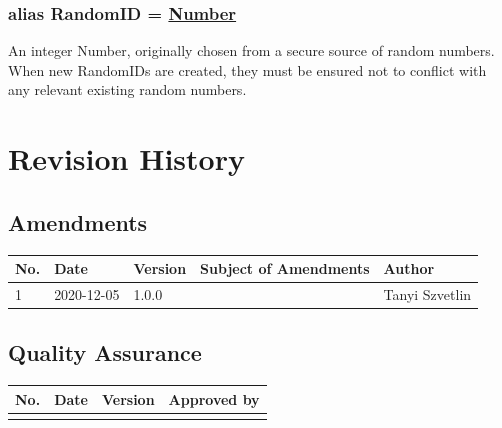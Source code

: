 \documentclass[a4paper]{arrowhead}
\newcommand{\pdef}[1]{{\textcolor{ArrowheadGrey}{#1\label{sec:model:primitives:#1}\label{sec:model:primitives:#1s}\label{sec:model:primitives:#1es}}}}
\newcommand{\pref}[1]{{\textcolor{ArrowheadGrey}{\hyperref[sec:model:primitives:#1]{#1}}}}
\begin{document}
\subsubsection{alias \pdef{RandomID} = \pref{Number}}

An integer Number, originally chosen from a secure source of random numbers. When new RandomIDs are created, they must be ensured not to conflict with any relevant existing random numbers.

\newpage


%

\newpage

\section{Revision History}
\subsection{Amendments}

\noindent\begin{tabularx}{\textwidth}{| p{1cm} | p{3cm} | p{2cm} | X | p{4cm} |} \hline
\rowcolor{gray!33} No. & Date & Version & Subject of Amendments & Author \\ \hline

1 & 2020-12-05 & 1.0.0 & & Tanyi Szvetlin \\ \hline

\end{tabularx}

\subsection{Quality Assurance}

\noindent\begin{tabularx}{\textwidth}{| p{1cm} | p{3cm} | p{2cm} | X |} \hline
\rowcolor{gray!33} No. & Date & Version & Approved by \\ \hline


 &  &  & \\ \hline
 
\end{tabularx}
\end{document}
